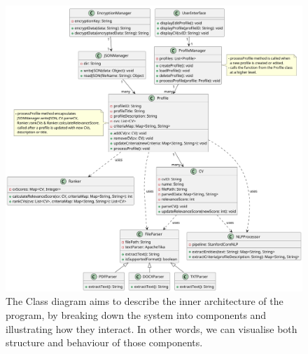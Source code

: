 \begin{figure}[h]
    \centering
    \includegraphics[width=1\linewidth]{img/UML/classDiagram.png}
    \caption{The Class diagram aims to describe the inner architecture of the program, by breaking down the system into components and illustrating how they interact. In other words, we can visualise both structure and behaviour of those components.}
\end{figure}
